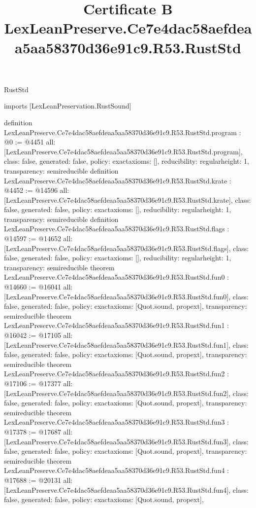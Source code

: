 \begin{lexlean}{RustStd}
\title{Certificate B LexLeanPreserve.Ce7e4dac58aefdeaa5aa58370d36e91c9.R53.RustStd}
\begin{coremodule}
imports [LexLeanPreservation.RustSound]

definition LexLeanPreserve.Ce7e4dac58aefdeaa5aa58370d36e91c9.R53.RustStd.program : @0 := @4451 {
  all: [LexLeanPreserve.Ce7e4dac58aefdeaa5aa58370d36e91c9.R53.RustStd.program],
  class: false,
  generated: false,
  policy: exact{axioms: []},
  reducibility: regular{height: 1},
  transparency: semireducible
}
definition LexLeanPreserve.Ce7e4dac58aefdeaa5aa58370d36e91c9.R53.RustStd.krate : @4452 := @14596 {
  all: [LexLeanPreserve.Ce7e4dac58aefdeaa5aa58370d36e91c9.R53.RustStd.krate],
  class: false,
  generated: false,
  policy: exact{axioms: []},
  reducibility: regular{height: 1},
  transparency: semireducible
}
definition LexLeanPreserve.Ce7e4dac58aefdeaa5aa58370d36e91c9.R53.RustStd.flags : @14597 := @14652 {
  all: [LexLeanPreserve.Ce7e4dac58aefdeaa5aa58370d36e91c9.R53.RustStd.flags],
  class: false,
  generated: false,
  policy: exact{axioms: []},
  reducibility: regular{height: 1},
  transparency: semireducible
}
theorem LexLeanPreserve.Ce7e4dac58aefdeaa5aa58370d36e91c9.R53.RustStd.fun0 : @14660 := @16041 {
  all: [LexLeanPreserve.Ce7e4dac58aefdeaa5aa58370d36e91c9.R53.RustStd.fun0],
  class: false,
  generated: false,
  policy: exact{axioms: [Quot.sound, propext]},
  transparency: semireducible
}
theorem LexLeanPreserve.Ce7e4dac58aefdeaa5aa58370d36e91c9.R53.RustStd.fun1 : @16042 := @17105 {
  all: [LexLeanPreserve.Ce7e4dac58aefdeaa5aa58370d36e91c9.R53.RustStd.fun1],
  class: false,
  generated: false,
  policy: exact{axioms: [Quot.sound, propext]},
  transparency: semireducible
}
theorem LexLeanPreserve.Ce7e4dac58aefdeaa5aa58370d36e91c9.R53.RustStd.fun2 : @17106 := @17377 {
  all: [LexLeanPreserve.Ce7e4dac58aefdeaa5aa58370d36e91c9.R53.RustStd.fun2],
  class: false,
  generated: false,
  policy: exact{axioms: [Quot.sound, propext]},
  transparency: semireducible
}
theorem LexLeanPreserve.Ce7e4dac58aefdeaa5aa58370d36e91c9.R53.RustStd.fun3 : @17378 := @17687 {
  all: [LexLeanPreserve.Ce7e4dac58aefdeaa5aa58370d36e91c9.R53.RustStd.fun3],
  class: false,
  generated: false,
  policy: exact{axioms: [Quot.sound, propext]},
  transparency: semireducible
}
theorem LexLeanPreserve.Ce7e4dac58aefdeaa5aa58370d36e91c9.R53.RustStd.fun4 : @17688 := @20131 {
  all: [LexLeanPreserve.Ce7e4dac58aefdeaa5aa58370d36e91c9.R53.RustStd.fun4],
  class: false,
  generated: false,
  policy: exact{axioms: [Quot.sound, propext]},
}
\end{coremodule}
\end{lexlean}
